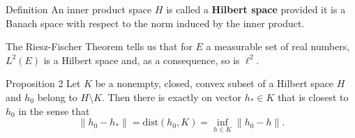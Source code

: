 \begin{namedthm*}{Definition}
    An inner product space $H$ is called a \textbf{Hilbert space} provided it is a Banach space with respect to the norm induced by the inner product.
\end{namedthm*}
The Riesz-Fischer Theorem tells us that for $E$ a measurable set of real numbers, $L^2(E)$ is a Hilbert space and, as a consequence, so is $\ell^2$.
\begin{namedthm*}{Proposition 2}
    Let $K$ be a nonempty, closed, convex subset of a Hilbert space $H$ and $h_0$ belong to $H\setminus K$.
    Then there is exactly on vector $h_*\in K$ that is closest to $h_0$ in the sense that
    \[
        \|h_0-h_*\|=\text{dist}(h_0,K)=\underset{h\in K}{\inf}\|h_0-h\|.
    \]
\end{namedthm*}

